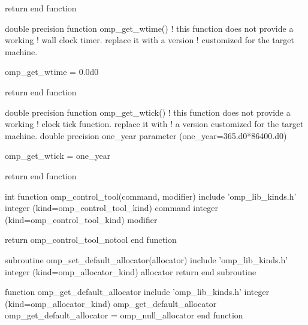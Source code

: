 {\begin{ompfFunction}
  return
end function

double precision function omp_get_wtime()
  ! this function does not provide a working
  ! wall clock timer. replace it with a version
  ! customized for the target machine.

  omp_get_wtime = 0.0d0

  return
end function

double precision function omp_get_wtick()
  ! this function does not provide a working
  ! clock tick function. replace it with
  ! a version customized for the target machine.
  double precision one_year
  parameter (one_year=365.d0*86400.d0)

  omp_get_wtick = one_year

  return
end function

int function omp_control_tool(command, modifier)
  include 'omp_lib_kinds.h'
  integer (kind=omp_control_tool_kind) command
  integer (kind=omp_control_tool_kind) modifier

  return omp_control_tool_notool
end function

subroutine omp_set_default_allocator(allocator)
  include 'omp_lib_kinds.h'
  integer (kind=omp_allocator_kind) allocator
  return
end subroutine

function omp_get_default_allocator
  include 'omp_lib_kinds.h'
  integer (kind=omp_allocator_kind) omp_get_default_allocator
  omp_get_default_allocator = omp_null_allocator
end function

\end{ompfFunction}} %
